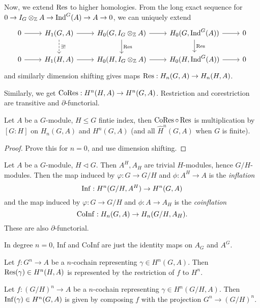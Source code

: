 \documentclass[11pt]{amsart}
\begin{document}
Now, we extend $\operatorname{Res}$ to higher homologies. From the long exact sequence for $0\to I_G\otimes_{\mathbb{Z}} A \to \operatorname{Ind}^G(A) \to A \to 0$, we can uniquely extend
\[
\begin{tikzcd}
0 \arrow[r] & H_1(G,A) \arrow[r] \arrow[d, "\exists!", dashed] & H_0(G, I_G\otimes_\ZZ A) \arrow[r] \arrow[d, "{\Res}"] & H_0(G, \Ind^G(A)) \arrow[r] \arrow[d, "{\Res}"] & 0 \\
0 \arrow[r] & H_1(H,A) \arrow[r] & H_0(H, I_G\otimes_\ZZ A) \arrow[r] & H_0(H, \Ind^G(A)) \arrow[r] & 0
\end{tikzcd}
\]
and similarly dimension shifting gives maps $\operatorname{Res}: H_n(G,A)\to H_n(H,A)$. 

Similarly, we get $\operatorname{CoRes}: H^n(H,A)\to H^n(G,A)$. Restriction and corestriction are transitive and $\partial$-functorial.


\begin{prop}
    Let $A$ be a $G$-module, $H\le G$ fintie index, then $\operatorname{CoRes}\circ \operatorname{Res}$ is multiplication by $[G:H]$ on $H_n(G,A)$ and $H^n(G,A)$ (and all $\hat{H}^n(G,A)$ when $G$ is finite).
\end{prop}

\begin{proof}
    Prove this for $n = 0$, and use dimension shifting.
\end{proof}

\begin{defn}
    Let $A$ be a $G$-module, $H\lhd G$. Then $A^H, A_H$ are trivial $H$-modules, hence $G/H$-modules. Then the map induced by $\varphi: G\to G/H$ and $\phi:A^H\to A$ is the \emph{inflation}
    \[\operatorname{Inf}: H^n(G/H, A^H) \to H^n(G,A)\]
    and the map induced by $\varphi: G\to G/H$ and $\phi: A\to A_H$ is the \emph{coinflation}
    \[\operatorname{CoInf}: H_n(G, A) \to H_n(G/H,A_H).\]
    These are also $\partial$-functorial.
\end{defn}

\begin{exm}
    In degree $n=0$, Inf and CoInf are just the identity maps on $A_G$ and $A^G$.
\end{exm}

\begin{exm}
    Let $f:G^n\to A$ be a $n$-cochain representing $\gamma\in H^n(G,A)$. Then $\operatorname{Res}(\gamma)\in H^n(H,A)$ is represented by the restriction of $f$ to $H^n$.

    Let $f:(G/H)^n\to A$ be a $n$-cochain representing $\gamma\in H^n(G/H,A)$. Then $\operatorname{Inf}(\gamma)\in H^n(G,A)$ is given by composing $f$ with the projection $G^n\to (G/H)^n$.
\end{exm}
\end{document}
